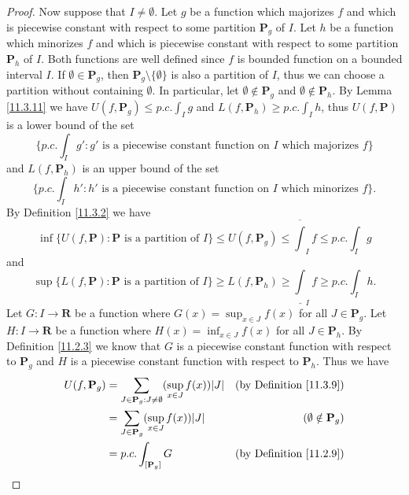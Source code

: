 \begin{proof}
    Now suppose that \(I \neq \emptyset\).
    Let \(g\) be a function which majorizes \(f\) and which is piecewise constant with respect to some partition \(\mathbf{P}_g\) of \(I\).
    Let \(h\) be a function which minorizes \(f\) and which is piecewise constant with respect to some partition \(\mathbf{P}_h\) of \(I\).
    Both functions are well defined since \(f\) is bounded function on a bounded interval \(I\).
    If \(\emptyset \in \mathbf{P}_g\), then \(\mathbf{P}_g \setminus \{\emptyset\}\) is also a partition of \(I\), thus we can choose a partition without containing \(\emptyset\).
    In particular, let \(\emptyset \notin \mathbf{P}_g\) and \(\emptyset \notin \mathbf{P}_h\).
    By Lemma \ref{11.3.11} we have \(U(f, \mathbf{P}_g) \leq p.c. \int_I g\) and \(L(f, \mathbf{P}_h) \geq p.c. \int_I h\), thus \(U(f, \mathbf{P})\) is a lower bound of the set
    \[
        \{p.c. \int_I g' : g' \text{ is a piecewise constant function on \(I\) which majorizes } f\}
    \]
    and
    \(L(f, \mathbf{P}_h)\) is an upper bound of the set
    \[
        \{p.c. \int_I h' : h' \text{ is a piecewise constant function on \(I\) which minorizes } f\}.
    \]
    By Definition \ref{11.3.2} we have
    \[
        \inf \{U(f, \mathbf{P}) : \mathbf{P} \text{ is a partition of } I\} \leq U(f, \mathbf{P}_g) \leq \overline{\int}_I f \leq p.c. \int_I g
    \]
    and
    \[
        \sup \{L(f, \mathbf{P}) : \mathbf{P} \text{ is a partition of } I\} \geq L(f, \mathbf{P}_h) \geq \underline{\int}_I f \geq p.c. \int_I h.
    \]
    Let \(G : I \to \mathbf{R}\) be a function where \(G(x) = \sup_{x \in J} f(x)\) for all \(J \in \mathbf{P}_g\).
    Let \(H : I \to \mathbf{R}\) be a function where \(H(x) = \inf_{x \in J} f(x)\) for all \(J \in \mathbf{P}_h\).
    By Definition \ref{11.2.3} we know that \(G\) is a piecewise constant function with respect to \(\mathbf{P}_g\) and \(H\) is a piecewise constant function with respect to \(\mathbf{P}_h\).
    Thus we have
    \begin{align*}
        U(f, \mathbf{P}_g) & = \sum_{J \in \mathbf{P}_g : J \neq \emptyset} (\sup_{x \in J} f(x)) \abs*{J} & \text{(by Definition \ref{11.3.9})}  \\
                           & = \sum_{J \in \mathbf{P}_g} (\sup_{x \in J} f(x)) \abs*{J}                    & (\emptyset \notin \mathbf{P}_g)      \\
                           & = p.c. \int_{[\mathbf{P}_g]} G                                                & \text{(by Definition \ref{11.2.9})}  \\

\end{align*}
\end{proof}
